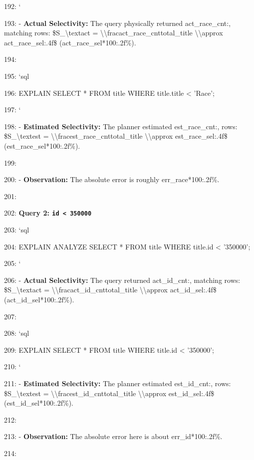 \documentclass[11pt,a4paper]{article}
\begin{document}
{192: \texttt{}`

193: - \textbf{Actual Selectivity:} The query physically returned {act\_race\_cnt:,} matching rows: \$S\_{\textbackslash{}text{act}} = \textbackslash{}\textbackslash{}frac{{{act\_race\_cnt}}}{{{total\_title}}} \textbackslash{}\textbackslash{}approx {act\_race\_sel:.4f}\$ ({act\_race\_sel*100:.2f}\%).

194:

195: \texttt{}`sql

196: EXPLAIN SELECT * FROM title WHERE title.title < 'Race';

197: \texttt{}`

198: - \textbf{Estimated Selectivity:} The planner estimated {est\_race\_cnt:,} rows: \$S\_{\textbackslash{}text{est}} = \textbackslash{}\textbackslash{}frac{{{est\_race\_cnt}}}{{{total\_title}}} \textbackslash{}\textbackslash{}approx {est\_race\_sel:.4f}\$ ({est\_race\_sel*100:.2f}\%).

199:

200: - \textbf{Observation:} The absolute error is roughly {err\_race*100:.2f}\%.

201:

202: \textbf{Query 2: \texttt{id < 350000}}

203: \texttt{}`sql

204: EXPLAIN ANALYZE SELECT * FROM title WHERE title.id < '350000';

205: \texttt{}`

206: - \textbf{Actual Selectivity:} The query returned {act\_id\_cnt:,} matching rows: \$S\_{\textbackslash{}text{act}} = \textbackslash{}\textbackslash{}frac{{{act\_id\_cnt}}}{{{total\_title}}} \textbackslash{}\textbackslash{}approx {act\_id\_sel:.4f}\$ ({act\_id\_sel*100:.2f}\%).

207:

208: \texttt{}`sql

209: EXPLAIN SELECT * FROM title WHERE title.id < '350000';

210: \texttt{}`

211: - \textbf{Estimated Selectivity:} The planner estimated {est\_id\_cnt:,} rows: \$S\_{\textbackslash{}text{est}} = \textbackslash{}\textbackslash{}frac{{{est\_id\_cnt}}}{{{total\_title}}} \textbackslash{}\textbackslash{}approx {est\_id\_sel:.4f}\$ ({est\_id\_sel*100:.2f}\%).

212:

213: - \textbf{Observation:} The absolute error here is about {err\_id*100:.2f}\%.

214:

}
\end{document}
